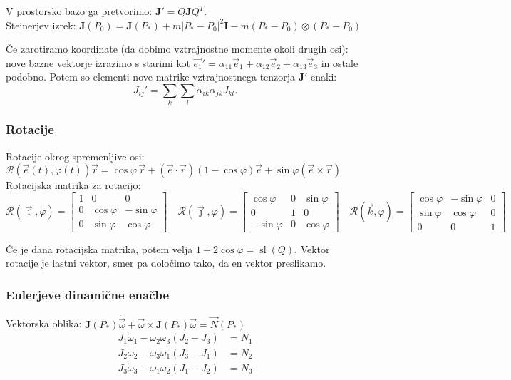 \documentclass[a4paper,10pt]{article}
\theoremstyle{definition}
\newcommand{\vomega}{\vec{\omega}}
\newcommand{\domega}{\dot{\vomega}}
\newcommand{\vr}{\vec{r}}
\newcommand{\Pt}{P_{\ast}}
\begin{document}
V prostorsko bazo ga pretvorimo: $\mathbf{J}' = Q\mathbf{J}Q^T$. \\
Steinerjev izrek: $\mathbf{J}(P_0) = \mathbf{J}(\Pt) + m|\Pt - P_0|^2\mathbf{I} - m(\Pt - P_0) \otimes (\Pt
- P_0)$

Če zarotiramo koordinate (da dobimo vztrajnostne momente okoli drugih osi): nove
bazne vektorje izrazimo s starimi kot $\vec{e_1}' = \alpha_{11} \vec{e}_1 +
\alpha_{12} \vec{e}_2 + \alpha_{13} \vec{e}_3$ in ostale podobno. Potem so
elementi nove matrike vztrajnostnega tenzorja $\mathbf{J}'$ enaki:
$${J}_{ij}' = \sum_k \sum_l \alpha_{ik} \alpha_{jk}{J}_{kl}.$$

\subsubsection*{Rotacije}
Rotacije okrog spremenljive osi:
$\mathcal R(\vec{e}(t),\varphi(t))\vr = \cos\varphi\,\vr +
(\vec{e}\cdot\vec{r})(1-\cos\varphi)\vec{e} + \sin\varphi(\vec{e} \times \vr)$ \\
Rotacijska matrika za rotacijo: \\
\[
  \mathcal R(\vec{\imath}, \varphi) =
  \begin{bmatrix}
    1 & 0 & 0 \\
    0 & \cos\varphi & -\sin\varphi \\
    0 & \sin\varphi & \cos\varphi
  \end{bmatrix} \quad
  \mathcal R(\vec{\jmath}, \varphi) =
  \begin{bmatrix}
    \cos\varphi & 0 & \sin\varphi  \\
    0           & 1 & 0   \\
    -\sin\varphi & 0 & \cos\varphi
  \end{bmatrix} \quad
  \mathcal R(\vec{k}, \varphi) =
  \begin{bmatrix}
    \cos\varphi & -\sin\varphi & 0 \\
    \sin\varphi & \cos\varphi & 0 \\
    0 & 0 & 1
  \end{bmatrix}
\]

Če je dana rotacijska matrika, potem velja $1 + 2\cos\varphi =
\operatorname{sl}(Q)$. Vektor rotacije je lastni vektor, smer pa določimo tako,
da en vektor preslikamo.

\subsubsection*{Eulerjeve dinamične enačbe}
Vektorska oblika: $\mathbf{J}(\Pt)\domega + \vomega \times \mathbf{J}(\Pt)\vomega =
\vec{N}(\Pt)$
\begin{align*}
  J_1\dot{\omega}_1 - \omega_2\omega_3(J_2 - J_3) &= N_1 \\
  J_2\dot{\omega}_2 - \omega_3\omega_1(J_3 - J_1) &= N_2 \\
  J_3\dot{\omega}_3 - \omega_1\omega_2(J_1 - J_2) &= N_3
\end{align*}
\end{document}
